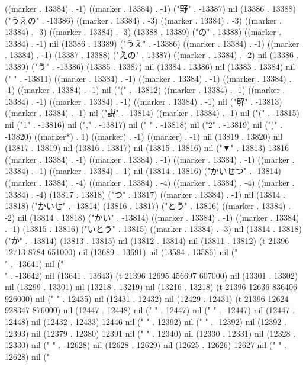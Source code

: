 ((marker . 13384) . -1) ((marker . 13384) . -1) ("野" . -13387) nil (13386 . 13388) ("うえの" . -13386) ((marker . 13384) . -3) ((marker . 13384) . -3) ((marker . 13384) . -3) ((marker . 13384) . -3) (13388 . 13389) ("の" . 13388) ((marker . 13384) . -1) nil (13386 . 13389) ("うえ" . -13386) ((marker . 13384) . -1) ((marker . 13384) . -1) (13387 . 13388) ("えの" . 13387) ((marker . 13384) . -2) nil (13386 . 13389) ("う" . -13386) (13385 . 13387) nil (13384 . 13386) nil (13383 . 13384) nil ("
" . -13811) ((marker . 13384) . -1) ((marker . 13384) . -1) ((marker . 13384) . -1) ((marker . 13384) . -1) nil ("(" . -13812) ((marker . 13384) . -1) ((marker . 13384) . -1) ((marker . 13384) . -1) ((marker . 13384) . -1) nil ("解" . -13813) ((marker . 13384) . -1) nil ("説" . -13814) ((marker . 13384) . -1) nil ("(" . -13815) nil ("1" . -13816) nil ("," . -13817) nil (" " . -13818) nil ("2" . -13819) nil (")" . -13820) ((marker*) . 1) ((marker) . -1) ((marker) . -1) nil (13819 . 13820) nil (13817 . 13819) nil (13816 . 13817) nil (13815 . 13816) nil ("▼" . 13813) 13816 ((marker . 13384) . -1) ((marker . 13384) . -1) ((marker . 13384) . -1) ((marker . 13384) . -1) ((marker . 13384) . -1) nil (13814 . 13816) ("かいせつ" . -13814) ((marker . 13384) . -4) ((marker . 13384) . -4) ((marker . 13384) . -4) ((marker . 13384) . -4) (13817 . 13818) ("つ" . 13817) ((marker . 13384) . -1) nil (13814 . 13818) ("かいせ" . -13814) (13816 . 13817) ("とう" . 13816) ((marker . 13384) . -2) nil (13814 . 13818) ("かい" . -13814) ((marker . 13384) . -1) ((marker . 13384) . -1) (13815 . 13816) ("いとう" . 13815) ((marker . 13384) . -3) nil (13814 . 13818) ("か" . -13814) (13813 . 13815) nil (13812 . 13814) nil (13811 . 13812) (t 21396 12713 8784 651000) nil (13689 . 13691) nil (13584 . 13586) nil ("\\" . -13641) nil ("\\" . -13642) nil (13641 . 13643) (t 21396 12695 456697 607000) nil (13301 . 13302) nil (13299 . 13301) nil (13218 . 13219) nil (13216 . 13218) (t 21396 12636 836406 926000) nil ("
" . 12435) nil (12431 . 12432) nil (12429 . 12431) (t 21396 12624 928347 876000) nil (12447 . 12448) nil ("
" . 12447) nil ("
" . -12447) nil (12447 . 12448) nil (12432 . 12433) 12446 nil ("
" . 12392) nil ("
" . -12392) nil (12392 . 12393) nil (12379 . 12380) 12391 nil ("
" . 12340) nil (12330 . 12331) nil (12328 . 12330) nil ("
" . -12628) nil (12628 . 12629) nil (12625 . 12626) 12627 nil ("
" . 12628) nil ("
